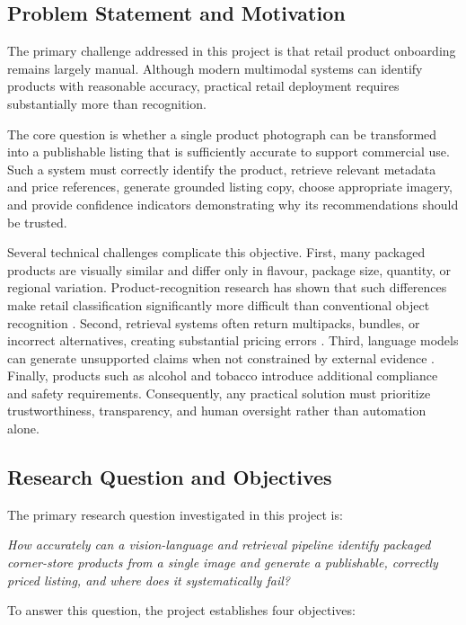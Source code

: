 \documentclass[conference]{IEEEtran}
\begin{document}
\subsection{Problem Statement and Motivation}

The primary challenge addressed in this project is that retail product onboarding remains largely manual. Although modern multimodal systems can identify products with reasonable accuracy, practical retail deployment requires substantially more than recognition.

The core question is whether a single product photograph can be transformed into a publishable listing that is sufficiently accurate to support commercial use. Such a system must correctly identify the product, retrieve relevant metadata and price references, generate grounded listing copy, choose appropriate imagery, and provide confidence indicators demonstrating why its recommendations should be trusted.

Several technical challenges complicate this objective. First, many packaged products are visually similar and differ only in flavour, package size, quantity, or regional variation. Product-recognition research has shown that such differences make retail classification significantly more difficult than conventional object recognition \cite{peng2020rp2k}. Second, retrieval systems often return multipacks, bundles, or incorrect alternatives, creating substantial pricing errors \cite{llp2025}. Third, language models can generate unsupported claims when not constrained by external evidence \cite{li2024modict}. Finally, products such as alcohol and tobacco introduce additional compliance and safety requirements. Consequently, any practical solution must prioritize trustworthiness, transparency, and human oversight rather than automation alone.

\subsection{Research Question and Objectives}

The primary research question investigated in this project is:

\textit{
How accurately can a vision-language and retrieval pipeline identify
packaged corner-store products from a single image and generate a
publishable, correctly priced listing, and where does it systematically fail?
}

To answer this question, the project establishes four objectives:
\end{document}
